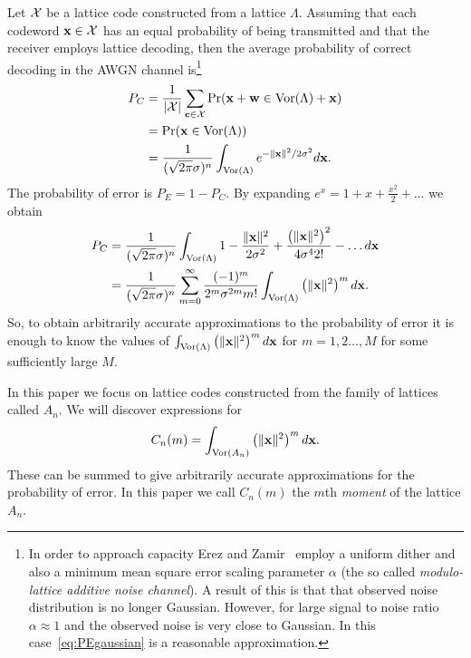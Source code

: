 \documentclass[draftcls, onecolumn, 11pt]{IEEEtran}
\begin{document}
Let $\mathcal X$ be a lattice code constructed from a lattice $\Lambda$.  Assuming that each codeword $\mathbf{x} \in \mathcal X$ has an equal probability of being transmitted and that the receiver employs lattice decoding, then the average probability of correct decoding in the AWGN channel is\footnote{In order to approach capacity Erez and Zamir~\cite{Erex2004_lattice_decoding} employ a uniform dither and also a minimum mean square error scaling parameter $\alpha$ (the so called \emph{modulo-lattice additive noise channel}).  A result of this is that that observed noise distribution is no longer Gaussian.  However, for large signal to noise ratio $\alpha \approx 1$ and the observed noise is very close to Gaussian.  In this case~\eqref{eq:PEgaussian} is a reasonable approximation.}
\begin{align}
P_C &= \frac{1}{\abs{\calX}} \sum_{\cbf\in \calX} \prob( \xbf + \wbf \in \vor(\Lambda) + \xbf )  \\
&= \prob(\xbf \in \vor(\Lambda) ) \nonumber \\
&=   \frac{1}{(\sqrt{2\pi}\sigma)^n} \int_{\vor(\Lambda)} e^{-\|\xbf\|^2 / 2\sigma^2 } d\xbf. \label{eq:PEgaussian}
\end{align}
The probability of error is $P_E = 1 - P_C$.  By expanding $e^x = 1  + x + \frac{x^2}{2} + \dots$ we obtain
\begin{align}
P_C &= \frac{1}{(\sqrt{2\pi}\sigma)^n}\int_{\vor(\Lambda)} 1 - \frac{\|\xbf\|^2}{2\sigma^2} + \frac{\left(\|\xbf\|^2\right)^2}{ 4\sigma^42!} - \dots d\xbf \nonumber \\
&= \frac{1}{(\sqrt{2\pi}\sigma)^n} \sum_{m=0}^\infty \frac{(-1)^m}{2^m\sigma^{2m}m!} \int_{\vor(\Lambda)} \left(\|\xbf\|^2\right)^m d\xbf.  \label{eq:summomentproberror}
\end{align}
So, to obtain arbitrarily accurate approximations to the probability of error it is enough to know the values of $\int_{\operatorname{Vor}(\Lambda)} \left(\|\mathbf{x}\|^2\right)^m d\mathbf{x}$ for $m=1,2\dots,M$ for some sufficiently large $M$.  

In this paper we focus on lattice codes constructed from the family of lattices called $A_n$. We will discover expressions for
\[
 C_n(m) = \int_{\operatorname{Vor}(A_n)} \left(\|\mathbf{x}\|^2\right)^m d\mathbf{x}.
\]
These can be summed to give arbitrarily accurate approximations for the probability of error.  In this paper we call $C_n(m)$ the $m$th \emph{moment} of the lattice $A_n$. 
\end{document}
